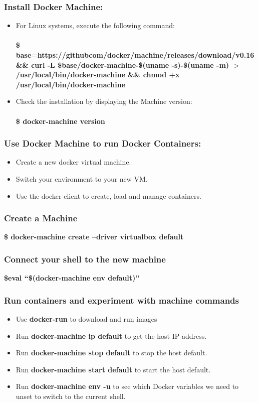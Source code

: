 \documentclass[12pt]{article}
\begin{document}
\subsubsection{Install Docker Machine:}
\begin{itemize}
	\item For Linux systems, execute the following command:\\\\
	\textbf{\$ base=https://githubcom/docker/machine/releases/download/v0.16 \&\& curl -L \$base/docker-machine-\$(uname -s)-\$(uname -m) $>$/usr/local/bin/docker-machine \&\& chmod +x /usr/local/bin/docker-machine}
	\item Check the installation by displaying the Machine version:\\\\
	\textbf{\$ docker-machine version}
\end{itemize}
\subsubsection{Use Docker Machine to run Docker Containers:}
\begin{itemize}
	\item Create a new docker virtual machine.
	\item Switch your environment to your new VM.
	\item Use the docker client to create, load and manage containers.
\end{itemize}
\subsubsection{Create a Machine}
\textbf{\$ docker-machine create --driver virtualbox default}
\subsubsection{Connect your shell to the new machine}
\textbf{\$eval “\$(docker-machine env default)”}
\subsubsection{Run containers and experiment with machine commands}
\begin{itemize}
	\item Use \textbf{docker-run} to download and run images
	\item Run \textbf{docker-machine ip default} to get the host IP address.
	\item Run \textbf{docker-machine stop default} to stop the host default.
	\item Run \textbf{docker-machine start default} to start the host default.
	\item Run \textbf{docker-machine env -u} to see which Docker variables we need to unset to switch to the current shell.
\end{itemize}
\end{document}
